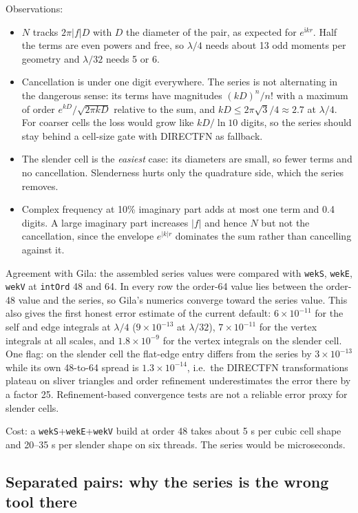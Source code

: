 \documentclass[11pt]{article}
\theoremstyle{remark}
\newcommand{\ii}{\mathrm{i}}
\newcommand{\code}[1]{\texttt{#1}}
\begin{document}
Observations:
\begin{itemize}[nosep]
\item $N$ tracks $2\pi|f|D$ with $D$ the diameter of the pair, as expected for
$e^{\ii kr}$. Half the terms are even powers and free, so $\lambda/4$ needs about 13
odd moments per geometry and $\lambda/32$ needs 5 or 6.
\item Cancellation is under one digit everywhere. The series is not alternating in
the dangerous sense: its terms have magnitudes $(kD)^n/n!$ with a maximum of order
$e^{kD}/\sqrt{2\pi kD}$ relative to the sum, and $kD \le 2\pi\sqrt{3}/4 \approx 2.7$
at $\lambda/4$. For coarser cells the loss would grow like $kD/\ln 10$ digits, so the
series should stay behind a cell-size gate with DIRECTFN as fallback.
\item The slender cell is the \emph{easiest} case: its diameters are small, so fewer
terms and no cancellation. Slenderness hurts only the quadrature side, which the
series removes.
\item Complex frequency at 10\% imaginary part adds at most one term and 0.4 digits.
A large imaginary part increases $|f|$ and hence $N$ but not the cancellation, since
the envelope $e^{|k|r}$ dominates the sum rather than cancelling against it.
\end{itemize}

Agreement with Gila: the assembled series values were compared with \code{wekS},
\code{wekE}, \code{wekV} at \code{intOrd} 48 and 64. In every row the order-64 value
lies between the order-48 value and the series, so Gila's numerics converge toward
the series value. This also gives the first honest error estimate of the current
default: $6\times 10^{-11}$ for the self and edge integrals at $\lambda/4$
($9\times 10^{-13}$ at $\lambda/32$), $7\times 10^{-11}$ for the vertex integrals at
all scales, and $1.8\times 10^{-9}$ for the vertex integrals on the slender cell. One
flag: on the slender cell the flat-edge entry differs from the series by
$3\times 10^{-13}$ while its own 48-to-64 spread is $1.3\times 10^{-14}$, i.e.\ the
DIRECTFN transformations plateau on sliver triangles and order refinement
underestimates the error there by a factor 25. Refinement-based convergence tests
are not a reliable error proxy for slender cells.

Cost: a \code{wekS}+\code{wekE}+\code{wekV} build at order 48 takes about 5 s per
cubic cell shape and 20--35 s per slender shape on six threads. The series would be
microseconds.

\subsection{Separated pairs: why the series is the wrong tool there}
\label{sec:far}
\end{document}
